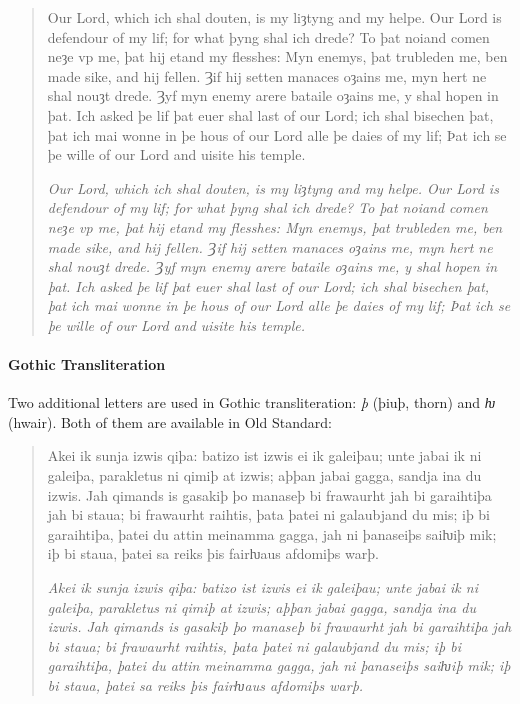 \documentclass[12pt,a4paper,openany]{book}
\begin{document}
\begin{quote}
\large

Our Lord, which ich shal douten, is my liȝtyng and my helpe. Our Lord is
defendour of my lif; for what þyng shal ich drede? To þat noiand comen
neȝe vp me, þat hij etand my flesshes: Myn enemys, þat trubleden me, ben
made sike, and hij fellen. Ȝif hij setten manaces oȝains me, myn hert ne
shal nouȝt drede. Ȝyf myn enemy arere bataile oȝains me, y shal hopen in
þat. Ich asked þe lif þat euer shal last of our Lord; ich shal bisechen
þat, þat ich mai wonne in þe hous of our Lord alle þe daies of my lif; Þat
ich se þe wille of our Lord and uisite his temple.

\smallskip

\itshape
Our Lord, which ich shal douten, is my liȝtyng and my helpe. Our Lord is
defendour of my lif; for what þyng shal ich drede? To þat noiand comen
neȝe vp me, þat hij etand my flesshes: Myn enemys, þat trubleden me, ben
made sike, and hij fellen. Ȝif hij setten manaces oȝains me, myn hert ne
shal nouȝt drede. Ȝyf myn enemy arere bataile oȝains me, y shal hopen in
þat. Ich asked þe lif þat euer shal last of our Lord; ich shal bisechen
þat, þat ich mai wonne in þe hous of our Lord alle þe daies of my lif; Þat
ich se þe wille of our Lord and uisite his temple.

\end{quote}

\paragraph{Gothic Transliteration}

Two additional letters are used in Gothic transliteration: \textit{þ}
(þiuþ, thorn) and \textit{ƕ} (hwair). Both of them are available in Old
Standard:

\begin{quote}
\large

Akei ik sunja izwis qiþa: batizo ist izwis ei ik galeiþau; unte jabai ik ni
galeiþa, parakletus ni qimiþ at izwis; aþþan jabai gagga, sandja ina du
izwis. Jah qimands is gasakiþ þo manaseþ bi frawaurht jah bi garaihtiþa
jah bi staua; bi frawaurht raihtis, þata þatei ni galaubjand du mis; iþ bi
garaihtiþa, þatei du attin meinamma gagga, jah ni þanaseiþs saiƕiþ mik;
iþ bi staua, þatei sa reiks þis fairƕaus afdomiþs warþ.

\smallskip

\itshape
Akei ik sunja izwis qiþa: batizo ist izwis ei ik galeiþau; unte jabai ik ni
galeiþa, parakletus ni qimiþ at izwis; aþþan jabai gagga, sandja ina du
izwis. Jah qimands is gasakiþ þo manaseþ bi frawaurht jah bi garaihtiþa
jah bi staua; bi frawaurht raihtis, þata þatei ni galaubjand du mis; iþ bi
garaihtiþa, þatei du attin meinamma gagga, jah ni þanaseiþs saiƕiþ mik;
iþ bi staua, þatei sa reiks þis fairƕaus afdomiþs warþ.

\end{quote}
 
\end{document}
